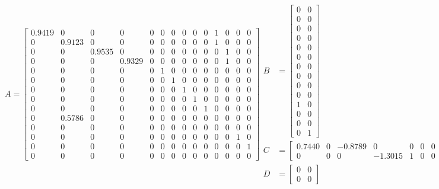 \documentclass[12pt]{article}
\begin{document}
\begin{subequations}
\begin{equation}
A = \begin{bmatrix}
0.9419	&0	&0	&0&	0&	0&	0&	0&	0&	0	&1&	0&	0&	0\\
0&	0.9123&	0&	0&	0&	0&	0&	0&	0&	0&	1&	0&	0&	0\\
0&	0&	0.9535&	0&	0&	0&	0&	0&	0&	0&	0&	1&	0&	0\\
0&	0&	0&	0.9329&	0&	0&	0&	0&	0&	0&	0&	1&	0&	0\\
0&	0&	0&	0&	0&	1&	0&	0&	0&	0&	0&	0&	0&	0\\
0&	0&	0&	0&	0&	0	&1	&0&	0&	0&	0&	0&	0&	0\\
0&	0&	0&	0&	0&	0&	0&	1&	0&	0&	0&	0&	0&	0\\
0&	0&	0&	0&	0&	0&	0&	0&	1&	0&	0&	0&	0&	0\\
0&	0&	0&	0&	0&	0&	0&	0&	0&	1&	0&	0&	0&	0\\
0&	0.5786&	0&	0&	0&	0&	0&	0&	0&	0&	0&	0&	0&	0\\
0&	0&	0&	0&	0&	0&	0&	0&	0&	0&	0&	0&	0&	0\\
0&	0&	0&	0&	0&	0&	0&	0&	0&	0&	0&	0&	1&	0\\
0&	0&	0&	0&	0&	0&	0&	0&	0&	0&	0&	0&	0&	1\\
0&	0&	0&	0&	0&	0&	0&	0&	0&	0&	0&	0&	0&	0
\end{bmatrix}
\end{equation}
\begin{align}
B &= \begin{bmatrix}
0&	0\\
0&	0\\
0&	0\\
0&	0\\
0&	0\\
0&	0\\
0&	0\\
0&	0\\
0&	0\\
0&	0\\
1&	0\\
0&	0\\
0&	0\\
0&	1
\end{bmatrix} \\
C &= \begin{bmatrix}
0.7440&	0&	-0.8789&	0&	0&	0&	0&	0&	0&	0&	0&	0&	0&	0 \\
0&	0&	0&	-1.3015&	1&	0&	0&	0&	0&	0&	0&	0&	0&	0
\end{bmatrix} \\
D &= \begin{bmatrix}
0&	0\\
0&	0
\end{bmatrix}
\end{align}
\end{subequations}
\end{document}
